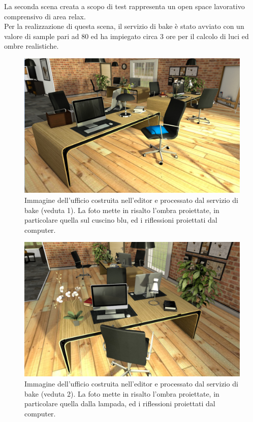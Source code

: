 La seconda scena creata a scopo di test rappresenta un open space lavorativo comprensivo di area relax.
\\
Per la realizzazione di questa scena, il servizio di bake  è stato avviato con un valore di sample pari ad 80 ed ha impiegato circa 3 ore per il calcolo di luci ed ombre realistiche.
\\
\begin{figure}[htb]
 \centering
 \includegraphics[width=1\linewidth]{images/chapter_prove_sperimentali/scena_office_vista1.png}\hfill
 \caption[Ambiente virtuale: Ufficio, veduta 1]{Immagine dell'ufficio costruita nell'editor e processato dal servizio di bake (veduta 1). La foto mette in risalto l'ombra proiettate, in particolare quella sul cuscino blu, ed i riflessioni proiettati dal computer.}
 \label{fig:prove_sperimentali_qualita_visiva_ufficio_1}
\end{figure}
\begin{figure}[htb]
 \centering
 \includegraphics[width=1\linewidth]{images/chapter_prove_sperimentali/scena_office_vista2.png}\hfill
 \caption[Ambiente virtuale: Ufficio, veduta 2]{Immagine dell'ufficio costruita nell'editor e processato dal servizio di bake (veduta 2). La foto mette in risalto l'ombra proiettate, in particolare quella dalla lampada, ed i riflessioni proiettati dal computer.}
 \label{fig:prove_sperimentali_qualita_visiva_ufficio_2}
\end{figure}
